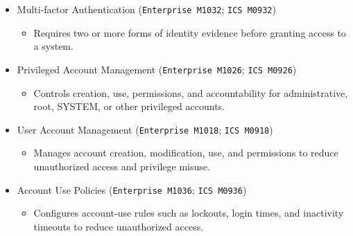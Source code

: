 \documentclass[10pt,a4paper,oneside]{report}
\begin{document}
\begin{itemize}
\begin{itemize}
\begin{itemize}
\item Requires users to authenticate before accessing data or sending commands to a device or system.
\end{itemize}
\item Multi-factor Authentication (\texttt{Enterprise M1032}; \texttt{ICS M0932})
\begin{itemize}
\item Requires two or more forms of identity evidence before granting access to a system.
\end{itemize}
\item Privileged Account Management (\texttt{Enterprise M1026}; \texttt{ICS M0926})
\begin{itemize}
\item Controls creation, use, permissions, and accountability for administrative, root, SYSTEM, or other privileged accounts.
\end{itemize}
\item User Account Management (\texttt{Enterprise M1018}; \texttt{ICS M0918})
\begin{itemize}
\item Manages account creation, modification, use, and permissions to reduce unauthorized access and privilege misuse.
\end{itemize}
\item Account Use Policies (\texttt{Enterprise M1036}; \texttt{ICS M0936})
\begin{itemize}
\item Configures account-use rules such as lockouts, login times, and inactivity timeouts to reduce unauthorized access.
\end{itemize}
\end{itemize}
\end{itemize}
\end{document}

